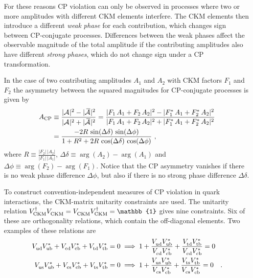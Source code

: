 For these reasons CP violation can only be observed in processes where two or more amplitudes with different CKM elements interfere. The
CKM elements then introduce a different \emph{weak phase} for each contribution, which changes sign between CP-conjugate processes.
Differences between the weak phases affect the observable magnitude of the total amplitude if the contributing amplitudes also have
different \emph{strong phases}, which do not change sign under a CP transformation.

In the case of two contributing amplitudes $A_1$ and $A_2$ with CKM factors $F_1$ and $F_2$ the asymmetry between the squared magnitudes
for CP-conjugate processes is given by
\begin{equation}
  \begin{split}
    A_\text{CP} &\equiv \frac{|\Af[]|^2 - |\Abarf[]|^2}{|\Af[]|^2 + |\Abarf[]|^2}
                 = \frac{|F_1\,A_1 + F_2\,A_2|^2 - |F_1^*\,A_1 + F_2^*\,A_2|^2}{|F_1\,A_1 + F_2\,A_2|^2 + |F_1^*\,A_1 + F_2^*\,A_2|^2} \\
                &= \frac{-2 R\, \sin(\Delta\delta)\, \sin(\Delta\phi)}{1 + R^2 + 2 R\, \cos(\Delta\delta)\, \cos(\Delta\phi)}
                   \ ,
  \end{split}
\end{equation}
where $R\equiv\frac{|F_2|\,|A_2|}{|F_1|\,|A_1|}$, $\Delta\delta\equiv\arg(A_2)-\arg(A_1)$ and $\Delta\phi\equiv\arg(F_2)-\arg(F_1)$. Notice
that the CP asymmetry vanishes if there is no weak phase difference $\Delta\phi$, but also if there is no strong phase difference
$\Delta\delta$.

To construct convention-independent measures of CP violation in quark interactions, the CKM-matrix unitarity constraints are used. The
unitarity relation $\VCKM[\dagger]\VCKM = \VCKM\VCKM[\dagger] = \mathbb{1}$ gives nine constraints. Six of these are orthogonality
relations, which contain the off-diagonal elements. Two examples of these relations are
\begin{subequations}
  \label{eq:unitConstraints}
  \begin{align}
    \label{eq:unitConstraints_d}
    \Vud\Vub[*] + \Vcd\Vcb[*] + \Vtd\Vtb[*] = 0 &\implies 1 + \frac{\Vud\Vub[*]}{\Vcd\Vcb[*]} + \frac{\Vtd\Vtb[*]}{\Vcd\Vcb[*]} = 0 \\
    \label{eq:unitConstraints_s}
    \Vus\Vub[*] + \Vcs\Vcb[*] + \Vts\Vtb[*] = 0 &\implies 1 + \frac{\Vus\Vub[*]}{\Vcs\Vcb[*]} + \frac{\Vts\Vtb[*]}{\Vcs\Vcb[*]} = 0
    \quad.
  \end{align}
\end{subequations}

